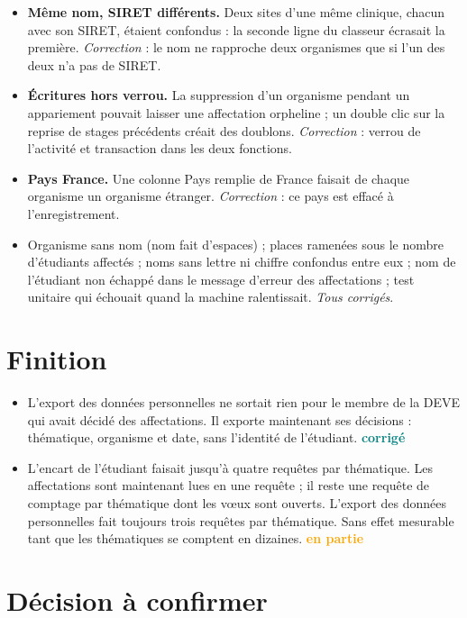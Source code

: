 \documentclass[11pt,a4paper]{article}
\newcommand{\grav}[1]{\textbf{\textcolor{#1}{\textbullet}}}
\newcommand{\mineure}{\grav{gray}}
\newcommand{\ok}{\textcolor{teal}{\textbf{corrigé}}}
\newcommand{\partiel}{\textcolor{orange}{\textbf{en partie}}}
\begin{document}
\begin{itemize}
  \item[\mineure] \textbf{Même nom, SIRET différents.} Deux sites d'une même clinique, chacun avec
    son SIRET, étaient confondus : la seconde ligne du classeur écrasait la première.
    \emph{Correction} : le nom ne rapproche deux organismes que si l'un des deux n'a pas de SIRET.
  \item[\mineure] \textbf{Écritures hors verrou.} La suppression d'un organisme pendant un
    appariement pouvait laisser une affectation orpheline ; un double clic sur la reprise de
    stages précédents créait des doublons. \emph{Correction} : verrou de l'activité et
    transaction dans les deux fonctions.
  \item[\mineure] \textbf{Pays \og France\fg{}.} Une colonne \og Pays\fg{} remplie de
    \og France\fg{} faisait de chaque organisme un organisme étranger. \emph{Correction} : ce pays
    est effacé à l'enregistrement.
  \item[\mineure] Organisme sans nom (nom fait d'espaces) ; places ramenées sous le nombre
    d'étudiants affectés ; noms sans lettre ni chiffre confondus entre eux ; nom de l'étudiant non
    échappé dans le message d'erreur des affectations ; test unitaire qui échouait quand la
    machine ralentissait. \emph{Tous corrigés}.
\end{itemize}

\section{Finition}

\begin{itemize}
  \item L'export des données personnelles ne sortait rien pour le membre de la DEVE qui avait
    décidé des affectations. Il exporte maintenant ses décisions : thématique, organisme et date,
    sans l'identité de l'étudiant. \ok
  \item L'encart de l'étudiant faisait jusqu'à quatre requêtes par thématique. Les affectations
    sont maintenant lues en une requête ; il reste une requête de comptage par thématique dont les
    vœux sont ouverts. L'export des données personnelles fait toujours trois requêtes par
    thématique. Sans effet mesurable tant que les thématiques se comptent en dizaines. \partiel
\end{itemize}

\section{Décision à confirmer}\label{sec:decision}
\end{document}
